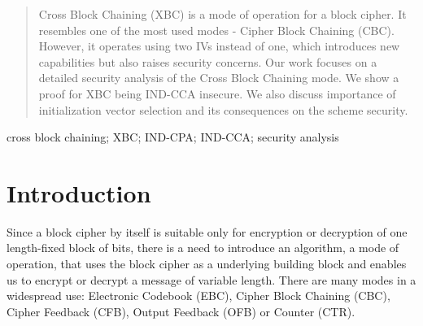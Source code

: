 \documentclass[conference]{IEEEtran}
\begin{document}




\maketitle

\begin{abstract}
Cross Block Chaining (XBC) \cite{watson} is a mode of operation for a block cipher. It resembles one of the most used modes - Cipher Block Chaining (CBC). However, it operates using two IVs instead of one, which introduces new capabilities but also raises security concerns. Our work focuses on a detailed security analysis of the Cross Block Chaining mode. We show a proof for XBC being IND-CCA insecure. We also discuss importance of initialization vector selection and its consequences on the scheme security.
\end{abstract}

\begin{keywords}
cross block chaining; XBC; IND-CPA; IND-CCA; security analysis
\end{keywords}

%
\IEEEpeerreviewmaketitle

\section{Introduction}

Since a block cipher by itself is suitable only for encryption or decryption of one length-fixed block of bits, there is a need to introduce an algorithm, a mode of operation, that uses the block cipher as a underlying building block and enables us to encrypt or decrypt a message of variable length. There are many modes in a widespread use: Electronic Codebook (EBC), Cipher Block Chaining (CBC), Cipher Feedback (CFB), Output Feedback (OFB) or Counter (CTR).
\end{document}
